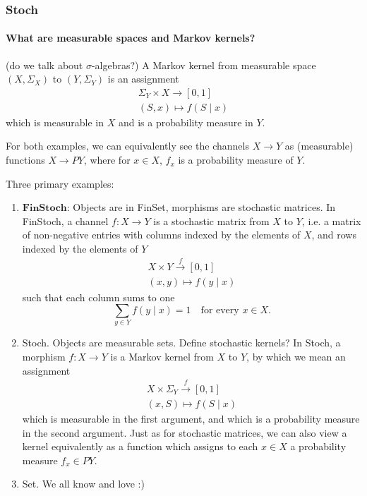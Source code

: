 \begin{frame}
    \frametitle{Stoch}
    \framesubtitle{What are measurable spaces and Markov kernels?}
    (do we talk about $\sigma$-algebras?)
    A Markov kernel from measurable space $(X, \Sigma_X)$ to $(Y, \Sigma_Y)$ is an assignment
    \begin{align*}
        \Sigma_Y \times X \to [0, 1]\\
        (S, x) \mapsto f(S\mid x)
    \end{align*}
    which is measurable in $X$ and is a probability measure in $Y$.
\end{frame}

\begin{frame}
    For both examples, we can equivalently see the channels $X\to Y$ as (measurable) functions $X\to PY$, where for $x\in X$, $f_x$ is a probability measure of $Y$.
    
\end{frame}

\begin{frame}
    Three primary examples:
    \begin{enumerate}
        \item $\mathbf{FinStoch}$: Objects are in FinSet, morphisms are stochastic matrices.
            In FinStoch, a channel $f: X\to Y$ is a stochastic matrix from $X$ to $Y$, i.e. a matrix of non-negative entries with columns indexed by the elements of $X$, and rows indexed by the elements of $Y$
            \begin{align*}
                X\times Y \stackrel{f}{\to} [0, 1]\\
                (x, y) \mapsto f(y\mid x)
            \end{align*}
            such that each column sums to one
            \[
                \sum_{y\in Y} f(y\mid x) = 1\quad \text{for every $x\in X$.}
            \]
        \item Stoch. Objects are measurable sets. Define stochastic kernels?
            In Stoch, a morphism $f: X\to Y$ is a Markov kernel from $X$ to $Y$, by which we mean an assignment
            \begin{align*}
                X\times \Sigma_Y \stackrel{f}{\to} [0, 1]\\
                (x, S) \mapsto f(S\mid x)
            \end{align*}
            which is measurable in the first argument, and which is a probability measure in the second argument. Just as for stochastic matrices, we can also view a kernel equivalently as a function which assigns to each $x\in X$ a probability measure $f_x\in PY$.
        \item Set. We all know and love :)
    \end{enumerate}
\end{frame}

